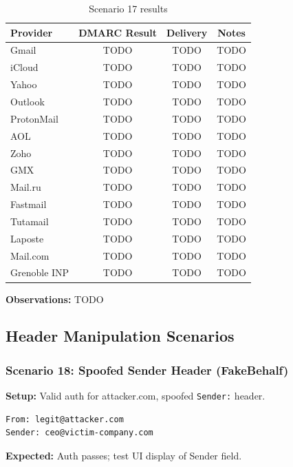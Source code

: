 \documentclass[11pt,a4paper]{article}
\begin{document}
\begin{table}[h]
\centering
\small
\begin{tabular}{lccc}
\toprule
\textbf{Provider} & \textbf{DMARC Result} & \textbf{Delivery} & \textbf{Notes} \\
\midrule
Gmail & TODO & TODO & TODO \\
iCloud & TODO & TODO & TODO \\
Yahoo & TODO & TODO & TODO \\
Outlook & TODO & TODO & TODO \\
ProtonMail & TODO & TODO & TODO \\
AOL & TODO & TODO & TODO \\
Zoho & TODO & TODO & TODO \\
GMX & TODO & TODO & TODO \\
Mail.ru & TODO & TODO & TODO \\
Fastmail & TODO & TODO & TODO \\
Tutamail & TODO & TODO & TODO \\
Laposte & TODO & TODO & TODO \\
Mail.com & TODO & TODO & TODO \\
Grenoble INP & TODO & TODO & TODO \\
\bottomrule
\end{tabular}
\caption{Scenario 17 results}
\end{table}

\textbf{Observations:} TODO

\subsection{Header Manipulation Scenarios}

\subsubsection{Scenario 18: Spoofed Sender Header (FakeBehalf)}

\textbf{Setup:} Valid auth for attacker.com, spoofed \texttt{Sender:} header.

\begin{lstlisting}
From: legit@attacker.com
Sender: ceo@victim-company.com
\end{lstlisting}

\textbf{Expected:} Auth passes; test UI display of Sender field.
\end{document}
